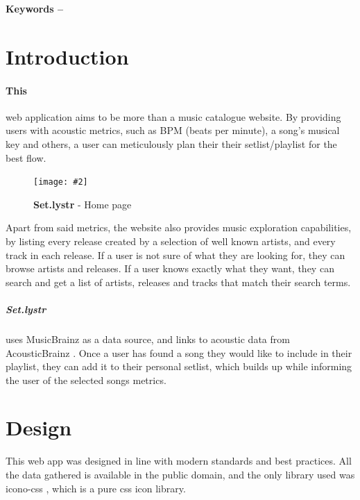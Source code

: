 \documentclass[10pt, a4paper]{article}
\title{\mytitle}
\author{\myauthor\hspace{1em}\\\contact\\Edinburgh Napier University\hspace{0.5em}-\hspace{0.5em}\mymodule}
\date{}
\newcommand{\figuremacro}[5]{
    \begin{figure}[#1]
        \centering
        \texttt{[image: \#2]}
        \caption[#3]{\textbf{#3}#4}
        \label{fig:#2}
    \end{figure}
}
\begin{document}
    \maketitle
    \begin{abstract}
        Set.lystr is a music catalogue exploration/playlist creation tool geared towards musicians who play cover songs. Set.lystr allows its users to search and compare songs and build the ultimate playlist.
    \end{abstract}
    
    \textbf{Keywords -- }{\mykeywords}
    
    \section{Introduction}
    \paragraph{This} web application aims to be more than a music catalogue website. By providing users with acoustic metrics, such as BPM (beats per minute), a song's musical key and others, a user can meticulously plan their their setlist/playlist for the best flow.
    
    \figuremacro{h}{index}{Set.lystr}{ - Home page}{1.0}
    
	Apart from said metrics, the website also provides music exploration capabilities, by listing every release created by a selection of well known artists, and every track in each release.
    If a user is not sure of what they are looking for, they can browse artists and releases. If a user knows exactly what they want, they can search and get a list of artists, releases and tracks that match their search terms.
	\subparagraph{Set.lystr} uses MusicBrainz \cite{journals/expert/Swartz02} as a data source, and links to acoustic data from AcousticBrainz  \cite{conf/ismir/PorterBKTS15}.
	Once a user has found a song they would like to include in their playlist, they can add it to their personal setlist, which builds up while informing the user of the selected songs metrics.
	
	\section{Design}
	This web app was designed in line with modern standards and best practices. All the data gathered is available in the public domain, and the only library used was icono-css \cite{Alipoor}, which is a pure css icon library.
\end{document}
